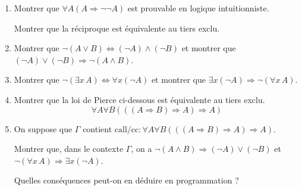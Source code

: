 \documentclass{article}
\begin{document}
\begin{enumerate}
\item Montrer que \(\forall A(A \Rightarrow \neg \neg A)\) est prouvable en logique intuitionniste.

  Montrer que la réciproque est équivalente au tiers exclu.
\item Montrer que \(\neg (A \vee B) \Leftrightarrow (\neg A) \wedge (\neg B)\)
et montrer que \((\neg A) \vee (\neg B) \Rightarrow \neg (A \wedge B)\).
\item Montrer que \(\neg (\exists x \, A) \Leftrightarrow \forall x (\neg A)\)
et montrer que \(\exists x (\neg A) \Rightarrow \neg (\forall x \, A)\).
\item Montrer que la loi de Pierce ci-dessous est équivalente au tiers exclu.
  \[\forall A\forall B(((A \Rightarrow B) \Rightarrow A) \Rightarrow A)\]
\item On suppose que \(\Gamma\) contient \(\text{call/cc} : \forall A\forall B(((A \Rightarrow B) \Rightarrow A) \Rightarrow A)\).

Montrer que, dans le contexte \(\Gamma\), on a \(\neg (A \wedge B) \Rightarrow (\neg A) \vee (\neg B)\)
et \(\neg (\forall x \, A) \Rightarrow \exists x (\neg A)\).

  Quelles conséquences peut-on en déduire en programmation ?
\end{enumerate}
\end{document}
